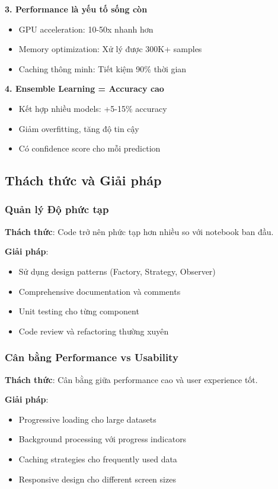 \textbf{3. Performance là yếu tố sống còn}
\begin{itemize}
    \item GPU acceleration: 10-50x nhanh hơn
    \item Memory optimization: Xử lý được 300K+ samples
    \item Caching thông minh: Tiết kiệm 90\% thời gian
\end{itemize}

\textbf{4. Ensemble Learning = Accuracy cao}
\begin{itemize}
    \item Kết hợp nhiều models: +5-15\% accuracy
    \item Giảm overfitting, tăng độ tin cậy
    \item Có confidence score cho mỗi prediction
\end{itemize}

\subsection{Thách thức và Giải pháp}

\subsubsection{Quản lý Độ phức tạp}

\textbf{Thách thức}: Code trở nên phức tạp hơn nhiều so với notebook ban đầu.

\textbf{Giải pháp}: 
\begin{itemize}
    \item Sử dụng design patterns (Factory, Strategy, Observer)
    \item Comprehensive documentation và comments
    \item Unit testing cho từng component
    \item Code review và refactoring thường xuyên
\end{itemize}

\subsubsection{Cân bằng Performance vs Usability}

\textbf{Thách thức}: Cân bằng giữa performance cao và user experience tốt.

\textbf{Giải pháp}:
\begin{itemize}
    \item Progressive loading cho large datasets
    \item Background processing với progress indicators
    \item Caching strategies cho frequently used data
    \item Responsive design cho different screen sizes
\end{itemize}


